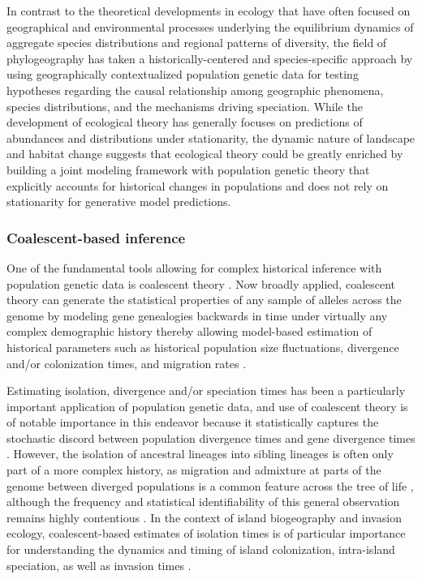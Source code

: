 \documentclass[12pt]{article}
\begin{document}
In contrast to the theoretical developments in ecology that have often
focused on geographical and environmental processes underlying the
equilibrium dynamics of aggregate species distributions and regional
patterns of diversity, the field of phylogeography has taken a
historically-centered and species-specific approach by using
geographically contextualized population genetic data for testing
hypotheses regarding the causal relationship among geographic
phenomena, species distributions, and the mechanisms driving
speciation. While the development of ecological theory has generally
focuses on predictions of abundances and distributions under
stationarity, the dynamic nature of landscape and habitat change
suggests that ecological theory could be greatly enriched by building
a joint modeling framework with population genetic theory that
explicitly accounts for historical changes in populations and does not
rely on stationarity for generative model predictions.

\subsubsection{Coalescent-based inference}

One of the fundamental tools allowing for complex historical inference
with population genetic data is coalescent theory \cite{Hudson1983-hx,
  Tajima1983-me, Kingman1982-uf, Kingman1982-ie, Rosenberg2002-ag}.
Now broadly applied, coalescent theory can generate the statistical
properties of any sample of alleles across the genome by modeling gene
genealogies backwards in time under virtually any complex demographic
history thereby allowing model-based estimation of historical
parameters such as historical population size fluctuations, divergence
and/or colonization times, and migration rates \cite{Wakeley2008-se}.

Estimating isolation, divergence and/or speciation times has been a
particularly important application of population genetic data, and use
of coalescent theory is of notable importance in this endeavor because
it statistically captures the stochastic discord between population
divergence times and gene divergence times \cite{Charlesworth2010-hn,
  Edwards2000-cs}. However, the isolation of ancestral lineages into
sibling lineages is often only part of a more complex history, as
migration and admixture at parts of the genome between diverged
populations is a common feature across the tree of life
\cite{Shapiro2016-rx, Mallet2016-iu, Sousa2013-ox, Nosil2008-km},
although the frequency and statistical identifiability of this general
observation remains highly contentious \cite{Cruickshank2014-bp,
  Yang2017-xy}. In the context of island biogeography and invasion
ecology, coalescent-based estimates of isolation times is of
particular importance for understanding the dynamics and timing of
island colonization, intra-island speciation, as well as invasion
times \cite{Estoup2003-ny, Estoup2004-cy, Hickerson2008-da,
  Gray2014-kp}.
\end{document}
